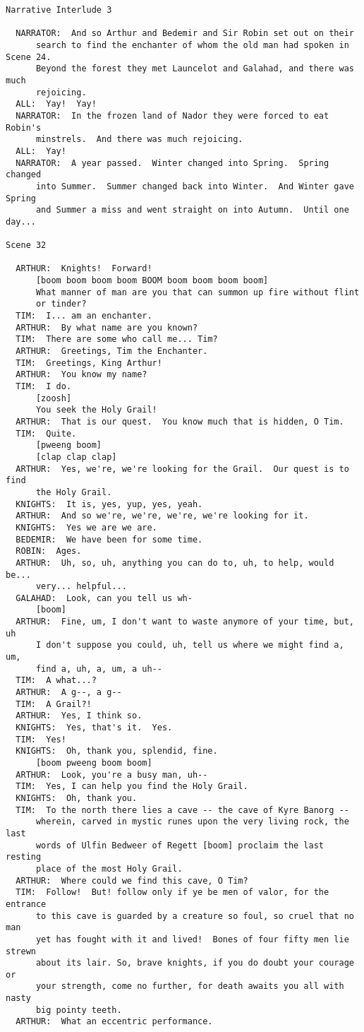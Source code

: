 \documentclass{article}
\begin{document}
\begin{verbatim}
Narrative Interlude 3

  NARRATOR:  And so Arthur and Bedemir and Sir Robin set out on their
      search to find the enchanter of whom the old man had spoken in Scene 24.
      Beyond the forest they met Launcelot and Galahad, and there was much
      rejoicing.
  ALL:  Yay!  Yay!
  NARRATOR:  In the frozen land of Nador they were forced to eat Robin's
      minstrels.  And there was much rejoicing.
  ALL:  Yay!
  NARRATOR:  A year passed.  Winter changed into Spring.  Spring changed
      into Summer.  Summer changed back into Winter.  And Winter gave Spring
      and Summer a miss and went straight on into Autumn.  Until one day...

Scene 32

  ARTHUR:  Knights!  Forward!
      [boom boom boom boom BOOM boom boom boom boom]
      What manner of man are you that can summon up fire without flint
      or tinder?
  TIM:  I... am an enchanter.
  ARTHUR:  By what name are you known?
  TIM:  There are some who call me... Tim?
  ARTHUR:  Greetings, Tim the Enchanter.
  TIM:  Greetings, King Arthur!
  ARTHUR:  You know my name?
  TIM:  I do.
      [zoosh]
      You seek the Holy Grail!
  ARTHUR:  That is our quest.  You know much that is hidden, O Tim.
  TIM:  Quite.
      [pweeng boom]
      [clap clap clap]
  ARTHUR:  Yes, we're, we're looking for the Grail.  Our quest is to find
      the Holy Grail.
  KNIGHTS:  It is, yes, yup, yes, yeah.
  ARTHUR:  And so we're, we're, we're, we're looking for it.
  KNIGHTS:  Yes we are we are.
  BEDEMIR:  We have been for some time.
  ROBIN:  Ages.
  ARTHUR:  Uh, so, uh, anything you can do to, uh, to help, would be...
      very... helpful...
  GALAHAD:  Look, can you tell us wh-
      [boom]
  ARTHUR:  Fine, um, I don't want to waste anymore of your time, but, uh
      I don't suppose you could, uh, tell us where we might find a, um,
      find a, uh, a, um, a uh--
  TIM:  A what...?
  ARTHUR:  A g--, a g--
  TIM:  A Grail?!
  ARTHUR:  Yes, I think so.
  KNIGHTS:  Yes, that's it.  Yes.
  TIM:  Yes!
  KNIGHTS:  Oh, thank you, splendid, fine.
      [boom pweeng boom boom]
  ARTHUR:  Look, you're a busy man, uh--
  TIM:  Yes, I can help you find the Holy Grail.
  KNIGHTS:  Oh, thank you.
  TIM:  To the north there lies a cave -- the cave of Kyre Banorg --
      wherein, carved in mystic runes upon the very living rock, the last
      words of Ulfin Bedweer of Regett [boom] proclaim the last resting
      place of the most Holy Grail.
  ARTHUR:  Where could we find this cave, O Tim?
  TIM:  Follow!  But! follow only if ye be men of valor, for the entrance
      to this cave is guarded by a creature so foul, so cruel that no man
      yet has fought with it and lived!  Bones of four fifty men lie strewn
      about its lair. So, brave knights, if you do doubt your courage or
      your strength, come no further, for death awaits you all with nasty
      big pointy teeth.
  ARTHUR:  What an eccentric performance.


\end{verbatim}
\end{document}
